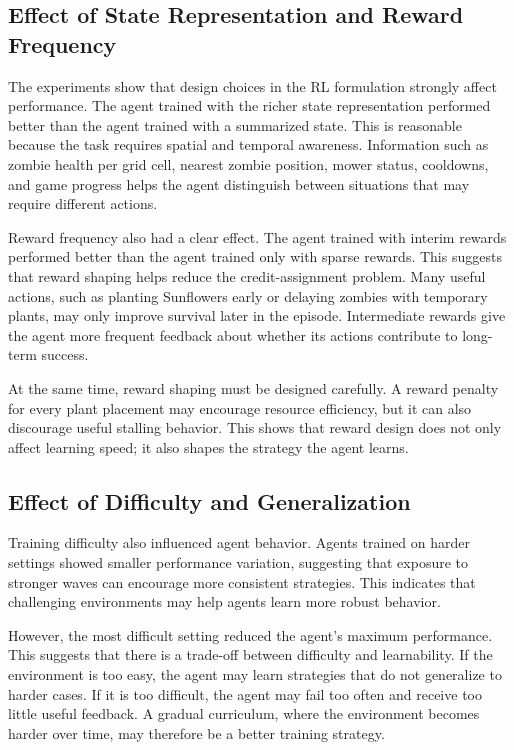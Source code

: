 \documentclass[conference,onecolumn]{IEEEtran}
\begin{document}
\subsection{Effect of State Representation and Reward Frequency}

The experiments show that design choices in the RL formulation strongly affect performance. The agent trained with the richer state representation performed better than the agent trained with a summarized state. This is reasonable because the task requires spatial and temporal awareness. Information such as zombie health per grid cell, nearest zombie position, mower status, cooldowns, and game progress helps the agent distinguish between situations that may require different actions.

Reward frequency also had a clear effect. The agent trained with interim rewards performed better than the agent trained only with sparse rewards. This suggests that reward shaping helps reduce the credit-assignment problem. Many useful actions, such as planting Sunflowers early or delaying zombies with temporary plants, may only improve survival later in the episode. Intermediate rewards give the agent more frequent feedback about whether its actions contribute to long-term success.

At the same time, reward shaping must be designed carefully. A reward penalty for every plant placement may encourage resource efficiency, but it can also discourage useful stalling behavior. This shows that reward design does not only affect learning speed; it also shapes the strategy the agent learns.

\subsection{Effect of Difficulty and Generalization}

Training difficulty also influenced agent behavior. Agents trained on harder settings showed smaller performance variation, suggesting that exposure to stronger waves can encourage more consistent strategies. This indicates that challenging environments may help agents learn more robust behavior.

However, the most difficult setting reduced the agent's maximum performance. This suggests that there is a trade-off between difficulty and learnability. If the environment is too easy, the agent may learn strategies that do not generalize to harder cases. If it is too difficult, the agent may fail too often and receive too little useful feedback. A gradual curriculum, where the environment becomes harder over time, may therefore be a better training strategy.
\end{document}
